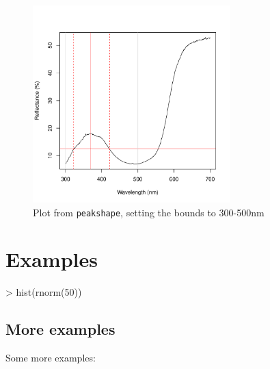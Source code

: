 \documentclass{article}
\newcommand{\code}[1]{{\tt #1}}  %
\begin{document}
\begin{figure}[H] %
\begin{center}
\includegraphics[width=3in]{pavo-fwhm2}
\end{center}
\caption{Plot from \code{peakshape}, setting the bounds to 300-500nm}
\label{figure:fwhm2}
\end{figure}


\section*{Examples}


\begin{Schunk}
\begin{Sinput}
> hist(rnorm(50))
\end{Sinput}
\end{Schunk}


\subsection*{More examples}

Some more examples:


\end{document}
